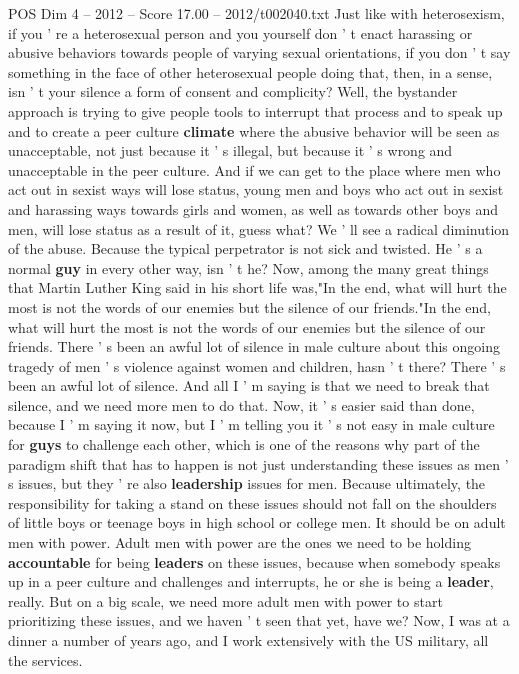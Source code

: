 \begin{textsample}{POS Dim 4 – 2012 – Score 17.00 – 2012/t002040.txt}
Just like with heterosexism, if you ' re a heterosexual person and you yourself don ' t enact harassing or abusive behaviors towards people of varying sexual orientations, if you don ' t say something in the face of other heterosexual people doing that, then, in a sense, isn ' t your silence a form of consent and complicity?
Well, the bystander approach is trying to give people tools to interrupt that process and to speak up and to create a peer culture \textbf{climate} where the abusive behavior will be seen as unacceptable, not just because it ' s illegal, but because it ' s wrong and unacceptable in the peer culture.
And if we can get to the place where men who act out in sexist ways will lose status, young men and boys who act out in sexist and harassing ways towards girls and women, as well as towards other boys and men, will lose status as a result of it, guess what?
We ' ll see a radical diminution of the abuse.
Because the typical perpetrator is not sick and twisted.
He ' s a normal \textbf{guy} in every other way, isn ' t he?
Now, among the many great things that Martin Luther King said in his short life was,"In the end, what will hurt the most is not the words of our enemies but the silence of our friends."In the end, what will hurt the most is not the words of our enemies but the silence of our friends.
There ' s been an awful lot of silence in male culture about this ongoing tragedy of men ' s violence against women and children, hasn ' t there?
There ' s been an awful lot of silence.
And all I ' m saying is that we need to break that silence, and we need more men to do that.
Now, it ' s easier said than done, because I ' m saying it now, but I ' m telling you it ' s not easy in male culture for \textbf{guys} to challenge each other, which is one of the reasons why part of the paradigm shift that has to happen is not just understanding these issues as men ' s issues, but they ' re also \textbf{leadership} issues for men.
Because ultimately, the responsibility for taking a stand on these issues should not fall on the shoulders of little boys or teenage boys in high school or college men.
It should be on adult men with power.
Adult men with power are the ones we need to be holding \textbf{accountable} for being \textbf{leaders} on these issues, because when somebody speaks up in a peer culture and challenges and interrupts, he or she is being a \textbf{leader}, really.
But on a big scale, we need more adult men with power to start prioritizing these issues, and we haven ' t seen that yet, have we?
Now, I was at a dinner a number of years ago, and I work extensively with the US military, all the services.

\end{textsample}
